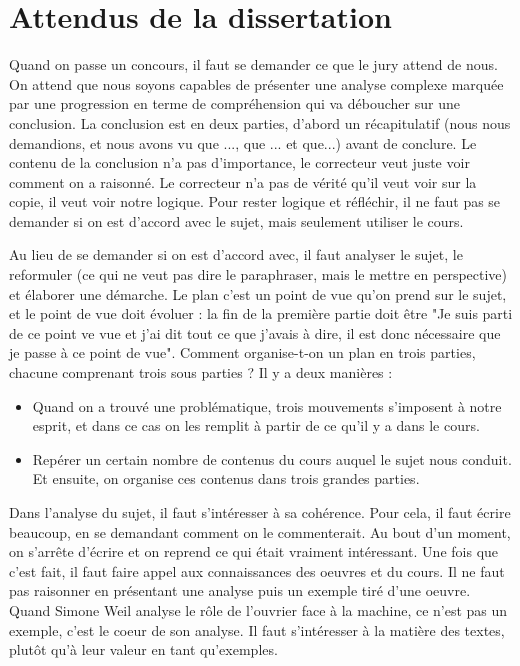 \documentclass[a4paper,12pt]{book}
\begin{document}
\section{Attendus de la dissertation}
Quand on passe un concours, il faut se demander ce que le jury attend de nous. On attend que nous soyons capables de présenter une analyse complexe marquée par une progression en terme de compréhension qui va déboucher sur une conclusion. La conclusion est en deux parties, d'abord un récapitulatif (nous nous demandions, et nous avons vu que ..., que ... et que...) avant de conclure. Le contenu de la conclusion n'a pas d'importance, le correcteur veut juste voir comment on a raisonné. Le correcteur n'a pas de vérité qu'il veut voir sur la copie, il veut voir notre logique. Pour rester logique et réfléchir, il ne faut pas se demander si on est d'accord avec le sujet, mais seulement utiliser le cours.
\par Au lieu de se demander si on est d'accord avec, il faut analyser le sujet, le reformuler (ce qui ne veut pas dire le paraphraser, mais le mettre en perspective) et élaborer une démarche. Le plan c'est un point de vue qu'on prend sur le sujet, et le point de vue doit évoluer : la fin de la première partie doit être "Je suis parti de ce point ve vue et j'ai dit tout ce que j'avais à dire, il est donc nécessaire que je passe à ce point de vue". Comment organise-t-on un plan en trois parties, chacune comprenant trois sous parties ? Il y a deux manières :\begin{itemize}
\item Quand on a trouvé une problématique, trois mouvements s'imposent à notre esprit, et dans ce cas on les remplit à partir de ce qu'il y a dans le cours.
\item Repérer un certain nombre de contenus du cours auquel le sujet nous conduit. Et ensuite, on organise ces contenus dans trois grandes parties.
\end{itemize}
Dans l'analyse du sujet, il faut s'intéresser à sa cohérence. Pour cela, il faut écrire beaucoup, en se demandant comment on le commenterait. Au bout d'un moment, on s'arrête d'écrire et on reprend ce qui était vraiment intéressant. Une fois que c'est fait, il faut faire appel aux connaissances des oeuvres et du cours. Il ne faut pas raisonner en présentant une analyse puis un exemple tiré d'une oeuvre. Quand Simone Weil analyse le rôle de l'ouvrier face à la machine, ce n'est pas un exemple, c'est le coeur de son analyse. Il faut s'intéresser à la matière des textes, plutôt qu'à leur valeur en tant qu'exemples.
\end{document}
